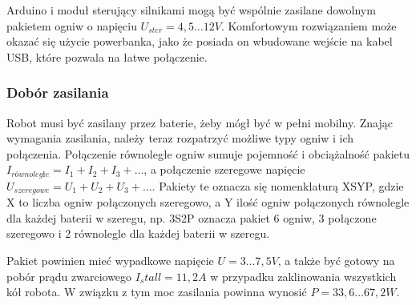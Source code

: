 \documentclass{report}
\begin{document}
Arduino i moduł sterujący silnikami mogą być wspólnie zasilane dowolnym pakietem ogniw o napięciu $U_{ster}=4,5\ldots12 V$. Komfortowym rozwiązaniem może okazać się użycie powerbanka, jako że posiada on wbudowane wejście na kabel USB, które pozwala na łatwe połączenie.

\newpage
\subsubsection{Dobór zasilania}

Robot musi być zasilany przez baterie, żeby mógł być w pełni mobilny. Znając wymagania zasilania, należy 
teraz rozpatrzyć możliwe typy ogniw i ich połączenia. Połączenie równoległe ogniw sumuje pojemność i 
obciążalność pakietu $I_{równoległe}=I_1+I_2+I_3+\ldots$, a połączenie szeregowe napięcie 
$U_{szeregowe}=U_1+U_2+U_3+\ldots$. Pakiety te oznacza się nomenklaturą XSYP, gdzie X to liczba ogniw 
połączonych szeregowo, a Y ilość ogniw połączonych równolegle dla każdej baterii w szeregu, np. 3S2P 
oznacza pakiet 6 ogniw, 3 połączone szeregowo i 2 równolegle dla każdej baterii w szeregu.

Pakiet powinien mieć wypadkowe napięcie $U=3\ldots7,5 V$, a także być gotowy na pobór prądu zwarciowego $I_stall=11,2 A$ w przypadku zaklinowania wszystkich kół robota. W związku z tym moc zasilania powinna wynosić $P=33,6\ldots67,2 W$.
\end{document}
